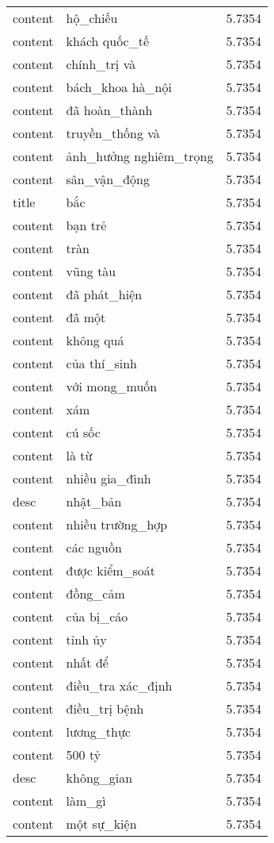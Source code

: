 \documentclass{article}
\begin{document}
\begin{tabular}{lll}
content & hộ\_chiếu & 5.7354\\
content & khách quốc\_tế & 5.7354\\
content & chính\_trị và & 5.7354\\
content & bách\_khoa hà\_nội & 5.7354\\
content & đã hoàn\_thành & 5.7354\\
content & truyền\_thống và & 5.7354\\
content & ảnh\_hưởng nghiêm\_trọng & 5.7354\\
content & sân\_vận\_động & 5.7354\\
title & bắc & 5.7354\\
content & bạn trẻ & 5.7354\\
content & tràn & 5.7354\\
content & vũng tàu & 5.7354\\
content & đã phát\_hiện & 5.7354\\
content & đã một & 5.7354\\
content & không quá & 5.7354\\
content & của thí\_sinh & 5.7354\\
content & với mong\_muốn & 5.7354\\
content & xám & 5.7354\\
content & cú sốc & 5.7354\\
content & là từ & 5.7354\\
content & nhiều gia\_đình & 5.7354\\
desc & nhật\_bản & 5.7354\\
content & nhiều trường\_hợp & 5.7354\\
content & các nguồn & 5.7354\\
content & được kiểm\_soát & 5.7354\\
content & đồng\_cảm & 5.7354\\
content & của bị\_cáo & 5.7354\\
content & tỉnh ủy & 5.7354\\
content & nhất để & 5.7354\\
content & điều\_tra xác\_định & 5.7354\\
content & điều\_trị bệnh & 5.7354\\
content & lương\_thực & 5.7354\\
content & 500 tỷ & 5.7354\\
desc & không\_gian & 5.7354\\
content & làm\_gì & 5.7354\\
content & một sự\_kiện & 5.7354\\

\end{tabular}
\end{document}
